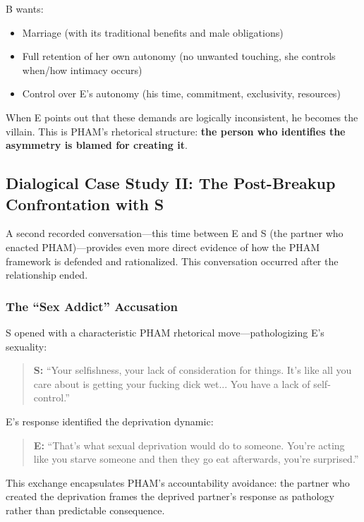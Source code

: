 \documentclass[12pt, letterpaper]{article}
\begin{document}
B wants:
\begin{itemize}
    \item Marriage (with its traditional benefits and male obligations)
    \item Full retention of her own autonomy (no unwanted touching, she controls when/how intimacy occurs)
    \item Control over E's autonomy (his time, commitment, exclusivity, resources)
\end{itemize}

When E points out that these demands are logically inconsistent, he becomes the villain. This is PHAM's rhetorical structure: \textbf{the person who identifies the asymmetry is blamed for creating it}.

\subsection{Dialogical Case Study II: The Post-Breakup Confrontation with S}

A second recorded conversation---this time between E and S (the partner who enacted PHAM)---provides even more direct evidence of how the PHAM framework is defended and rationalized. This conversation occurred after the relationship ended.

\subsubsection{The ``Sex Addict'' Accusation}

S opened with a characteristic PHAM rhetorical move---pathologizing E's sexuality:

\begin{quote}
\textbf{S:} ``Your selfishness, your lack of consideration for things. It's like all you care about is getting your fucking dick wet... You have a lack of self-control.''
\end{quote}

E's response identified the deprivation dynamic:

\begin{quote}
\textbf{E:} ``That's what sexual deprivation would do to someone. You're acting like you starve someone and then they go eat afterwards, you're surprised.''
\end{quote}

This exchange encapsulates PHAM's accountability avoidance: the partner who created the deprivation frames the deprived partner's response as pathology rather than predictable consequence.
\end{document}
